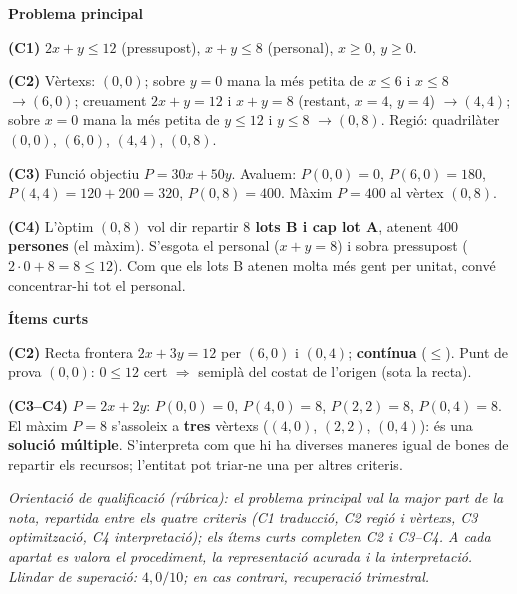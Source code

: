 \newpage
\begin{solucions}

\noindent\textbf{Problema principal}
\begin{sollist}
  \item \textbf{(C1)} $2x+y\le 12$ (pressupost), $x+y\le 8$ (personal), $x\ge 0$,
        $y\ge 0$.
  \item \textbf{(C2)} Vèrtexs: $(0,0)$; sobre $y=0$ mana la més petita de $x\le 6$ i
        $x\le 8$ $\rightarrow (6,0)$; creuament $2x+y=12$ i $x+y=8$ (restant, $x=4$,
        $y=4$) $\rightarrow (4,4)$; sobre $x=0$ mana la més petita de $y\le 12$ i
        $y\le 8$ $\rightarrow (0,8)$. Regió: quadrilàter $(0,0)$, $(6,0)$, $(4,4)$,
        $(0,8)$.
  \item \textbf{(C3)} Funció objectiu $P=30x+50y$. Avaluem:
        $P(0,0)=0$, $P(6,0)=180$, $P(4,4)=120+200=320$, $P(0,8)=400$. Màxim
        $P=400$ al vèrtex $(0,8)$.
  \item \textbf{(C4)} L'òptim $(0,8)$ vol dir repartir \textbf{$8$ lots B i cap lot A},
        atenent \textbf{$400$ persones} (el màxim). S'esgota el personal ($x+y=8$) i
        sobra pressupost ($2\cdot 0+8=8\le 12$). Com que els lots B atenen molta més
        gent per unitat, convé concentrar-hi tot el personal.
\end{sollist}

\noindent\textbf{Ítems curts}
\begin{sollist}\setcounter{enumi}{4}
  \item \textbf{(C2)} Recta frontera $2x+3y=12$ per $(6,0)$ i $(0,4)$;
        \textbf{contínua} ($\le$). Punt de prova $(0,0)$: $0\le 12$ cert $\Rightarrow$
        semiplà del costat de l'origen (sota la recta).
  \item \textbf{(C3--C4)} $P=2x+2y$: $P(0,0)=0$, $P(4,0)=8$, $P(2,2)=8$, $P(0,4)=8$.
        El màxim $P=8$ s'assoleix a \textbf{tres} vèrtexs ($(4,0)$, $(2,2)$, $(0,4)$):
        és una \textbf{solució múltiple}. S'interpreta com que hi ha diverses maneres
        igual de bones de repartir els recursos; l'entitat pot triar-ne una per altres
        criteris.
\end{sollist}

\end{solucions}

\noindent\small\textit{Orientació de qualificació (rúbrica): el problema principal
val la major part de la nota, repartida entre els quatre criteris (C1 traducció, C2
regió i vèrtexs, C3 optimització, C4 interpretació); els ítems curts completen C2 i
C3--C4. A cada apartat es valora el procediment, la representació acurada i la
interpretació. Llindar de superació: $4,0/10$; en cas contrari, recuperació
trimestral.}
